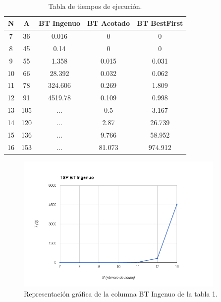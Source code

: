 \documentclass[es]{ifirak}
\begin{document}
\paragraph{}
\begin{center}
	\begin{table}[htbp]
		\centering
		\begin{tabular}{|c|c|c|c|c|}
		\hline
		\cellcolor{gray}	N & \cellcolor{gray}A & \cellcolor{gray}BT Ingenuo &\cellcolor{gray} BT Acotado &\cellcolor{gray} BT BestFirst \\
		\hline
		7 & 36 & 0.016     & 0		& 0  	\\
		8 & 45 & 0.14      & 0		& 0		\\
		9 & 55 & 1.358     & 0.015	& 0.031	\\
		10 & 66 & 28.392   & 0.032	& 0.062	\\
		11 & 78 & 324.606  & 0.269	& 1.809	\\
		12 & 91 &  4519.78 & 0.109	& 0.998	\\
		13 & 105 &  ...    & 0.5	& 3.167	\\
		14 & 120 &  ...    & 2.87	& 26.739	\\
		15 & 136 & 	...	   & 9.766	& 58.952	\\
		16 & 153 & 	...	   & 81.073	& 974.912	\\
		\hline
		\end{tabular}
		\caption{Tabla de tiempos de ejecución.}\label{table}
	\end{table}
\end{center}


\begin{figure}[htbp]
	\centering
	\includegraphics[width=0.9\textwidth]{BTING.png}
	\caption{Representación gráfica de la columna BT Ingenuo de la tabla 1. }\label{figure}
\end{figure}
\end{document}
